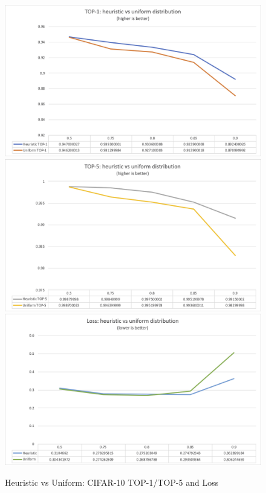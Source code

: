 \begin{figure}
    \centering
    {\includegraphics[width=.85\linewidth]{images/experiments/cifar10_top1.png}}
    {\includegraphics[width=.85\linewidth]{images/experiments/cifar10_top5.png}}
    {\includegraphics[width=.85\linewidth]{images/experiments/cifar10_loss.png}}
    \caption{Heuristic vs Uniform: CIFAR-10 TOP-1/TOP-5 and Loss}\label{fig:cifar10_top1_top5_loss}
\end{figure}

